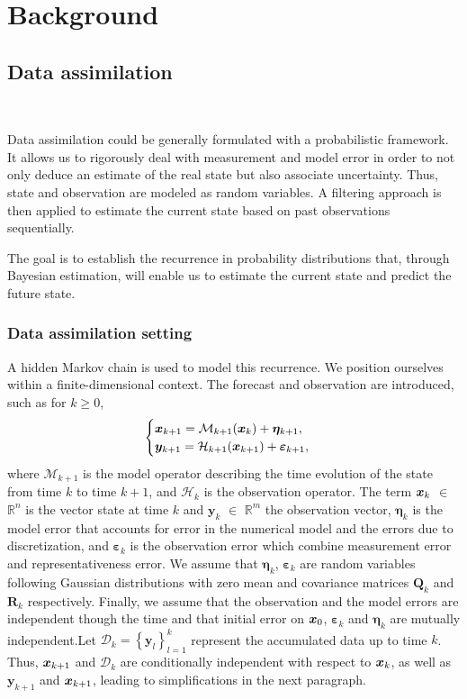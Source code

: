 
\section{Background}

\subsection{Data assimilation}~\label{Background_DA}

Data assimilation could be generally formulated with a probabilistic framework. It allows us to rigorously deal with measurement and model error in order to not only deduce an estimate of the real state but also associate uncertainty. Thus, state and observation are modeled as random variables. A filtering approach is then applied to estimate the current state based on past observations sequentially.

The goal is to establish the recurrence in probability distributions that, through Bayesian estimation, will enable us to estimate the current state and predict the future state.


\subsubsection{Data assimilation setting}

A hidden Markov chain is used to model this recurrence. We position ourselves within a finite-dimensional context. The forecast and observation are introduced, such as for $ k \geq 0$,
\[
    \begin{cases}
        \bm{x}_{k+1} = \mathcal{M}_{k+1} (\bm{x}_{k}) + \bm{\eta}_{k+1}, \\
        \bm{y}_{k+1} = \mathcal{H}_{k+1} (\bm{x}_{k+1}) + \bm \varepsilon_{k+1},
    \end{cases}
\]where $\mathcal{M}_{k+1}$ is the model operator describing the time evolution of the state from time $k$ to time $k+1$, and $\mathcal{H}_k$ is the observation operator. The term $\bm{x}_k$ $\in$ $\mathbb{R}^n$ is the vector state at time $k$ and $\bm{y}_k$ $\in$ $\mathbb{R}^m$ the observation vector, $\bm{\eta}_{k}$ is the model error that accounts for error in the numerical model and the errors due to discretization, and $\bm{\varepsilon}_k$ is the observation error which combine measurement error and representativeness error. We assume that $\bm{\eta}_{k}$, $\bm{\varepsilon}_k$ are random variables following Gaussian distributions with zero mean and covariance matrices $\bm Q_k$ and $\bm R_k$ respectively. Finally, we assume that the observation and the model errors are independent though the time and that initial error on $\bm{x}_0$, $\bm{\varepsilon}_k$ and $\bm{\eta}_{k}$ are mutually independent.Let $\mathcal{D}_k = \left\{\bm y_l\right\}_{l=1}^k$ represent the accumulated data up to time $k$.
Thus, $\bm{x}_{k+1}$ and $\mathcal{D}_k$ are conditionally independent with respect to $\bm{x}_{k}$, as well as $\bm{y}_{k+1}$ and $\bm{x}_{k+1}$, leading to simplifications in the next paragraph.

